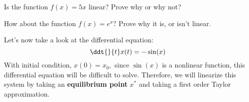 \begin{enumerate}
  \qitem Is the function $f(x) = 5x$ linear? Prove why or why not?


  \qitem How about the function $f(x) = e^{x}?$ Prove why it is, or isn't linear.

\end{enumerate}

Let's now take a look at the differential equation:
\begin{equation} \label{eqn:nl}
  \ddt{}{t} x(t) = - \sin(x)
\end{equation}
With initial condition, $x(0) = x_{0},$ since $\sin(x)$ is a nonlinear function, this differential equation will be difficult to solve.
Therefore, we will linearize this system by taking an \textbf{equilibrium point} $x^{*}$ and taking a first order Taylor approximation.

